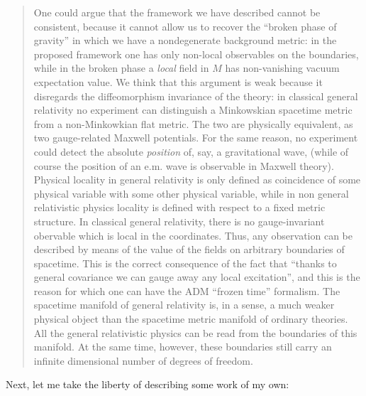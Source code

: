 \documentclass{article}
\def\tightlist{}
\renewcommand{\texttt}[1]{%
  \begingroup
  \ttfamily
  \begingroup\lccode`~=`/\lowercase{\endgroup\def~}{/\discretionary{}{}{}}%
  \begingroup\lccode`~=`[\lowercase{\endgroup\def~}{[\discretionary{}{}{}}%
  \begingroup\lccode`~=`.\lowercase{\endgroup\def~}{.\discretionary{}{}{}}%
  \catcode`/=\active\catcode`[=\active\catcode`.=\active
  \scantokens{#1\noexpand}%
  \endgroup
}
\begin{document}
\begin{quote}
One could argue that the framework we have described cannot be
consistent, because it cannot allow us to recover the ``broken phase of
gravity'' in which we have a nondegenerate background metric: in the
proposed framework one has only non-local observables on the boundaries,
while in the broken phase a \emph{local} field in \(M\) has
non-vanishing vacuum expectation value. We think that this argument is
weak because it disregards the diffeomorphism invariance of the theory:
in classical general relativity no experiment can distinguish a
Minkowskian spacetime metric from a non-Minkowkian flat metric. The two
are physically equivalent, as two gauge-related Maxwell potentials. For
the same reason, no experiment could detect the absolute \emph{position}
of, say, a gravitational wave, (while of course the position of an e.m.
wave is observable in Maxwell theory). Physical locality in general
relativity is only defined as coincidence of some physical variable with
some other physical variable, while in non general relativistic physics
locality is defined with respect to a fixed metric structure. In
classical general relativity, there is no gauge-invariant obervable
which is local in the coordinates. Thus, any observation can be
described by means of the value of the fields on arbitrary boundaries of
spacetime. This is the correct consequence of the fact that ``thanks to
general covariance we can gauge away any local excitation'', and this is
the reason for which one can have the ADM ``frozen time'' formalism. The
spacetime manifold of general relativity is, in a sense, a much weaker
physical object than the spacetime metric manifold of ordinary theories.
All the general relativistic physics can be read from the boundaries of
this manifold. At the same time, however, these boundaries still carry
an infinite dimensional number of degrees of freedom.
\end{quote}

Next, let me take the liberty of describing some work of my own:

\end{document}
